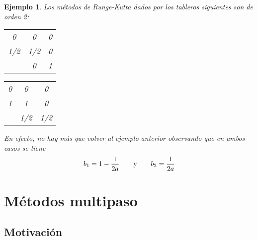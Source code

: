 \documentclass[11pt]{report}
\theoremstyle{mytheorem}
\theoremstyle{mydefinition}
\theoremstyle{myexample}
\newtheorem*{example}{Ejemplo}
\begin{document}
\begin{example}
Los métodos de Runge-Kutta dados por los tableros siguientes son de orden 2:
\begin{center}
\setlength\extrarowheight{2.5pt}
\begin{tabular}{c|cc}
    0 & 0 & 0\\
    1/2 & 1/2 & 0 \\ \hline
    & 0 & 1
\end{tabular}
\qquad \qquad \qquad
\begin{tabular}{c|cc}
    0 & 0 & 0\\
    1 & 1 & 0 \\ \hline
    & 1/2 & 1/2
\end{tabular}
\end{center}
En efecto, no hay más que volver al ejemplo anterior observando que en ambos casos se tiene
\[b_1 = 1-\frac{1}{2a} \qquad \textup{y} \qquad b_2 = \frac{1}{2a}\]
\end{example}

\chapter{Métodos multipaso}

\section{Motivación}
\end{document}
